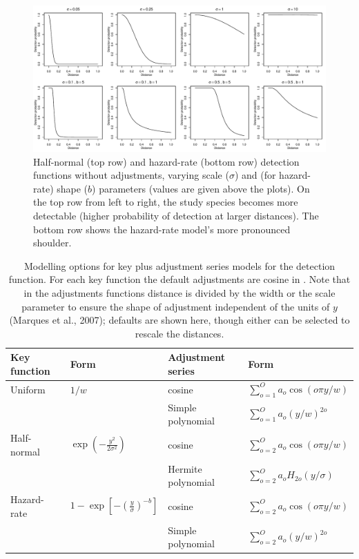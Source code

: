 \documentclass[article,shortnames]{jss}
\begin{document}
\begin{CodeChunk}
\begin{figure}

{\centering \includegraphics{paper_files/figure-latex/hn-hr-par-comp-1} 

}

\caption{Half-normal (top row) and hazard-rate (bottom row) detection functions without adjustments, varying scale ($\sigma$) and (for hazard-rate) shape ($b$) parameters (values are given above the plots). On the top row from left to right, the study species becomes more detectable (higher probability of detection at larger distances). The bottom row shows the hazard-rate model's more pronounced shoulder.\label{fig:hnhr}}\label{fig:hn-hr-par-comp}
\end{figure}
\end{CodeChunk}

\begin{table}
\begin{tabular}{llll}
\hline
Key function   & Form   & Adjustment series & Form\\
\hline
 Uniform  & $1/w$   & cosine  & $\sum_{o=1}^O a_o \cos(o \pi y/w)$ \\
 & & Simple polynomial & $\sum_{o=1}^O a_o (y/w)^{2o}$ \\
 Half-normal  & $\exp\left(-\frac{y^2}{2 \sigma^2}\right)$ & cosine  & $\sum_{o=2}^O a_o \cos(o \pi y/w)$ \\
 & & Hermite polynomial & $\sum_{o=2}^O a_o H_{2o}(y/\sigma)$ \\
 Hazard-rate  & $1-\exp\left[-\left(\frac{y}{\sigma}\right)^{-b}\right]$ & cosine  & $\sum_{o=2}^O a_o \cos(o \pi y/w)$ \\
 & & Simple polynomial & $\sum_{o=2}^O a_o (y/w)^{2o}$ \\
\hline
\end{tabular}
\label{tab:keyadj}
\caption{Modelling options for key plus adjustment series models for the detection function. For each key function the default adjustments are cosine in . Note that in the adjustments functions distance is divided by the width or the scale parameter to ensure the shape of adjustment independent of the units of $y$ (Marques et al., 2007); defaults are shown here, though either can be selected to rescale the distances.}
\end{table}
\end{document}
